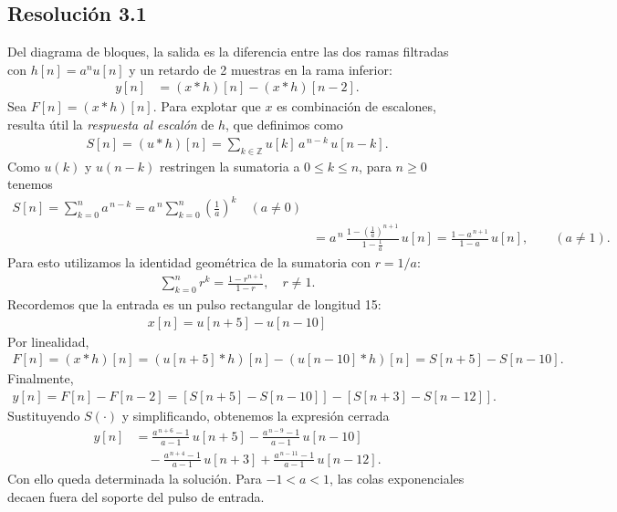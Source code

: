 \documentclass[
  11pt,
  letterpaper,
   addpoints,
   answers
  ]{exam}
\begin{document}
\begin{questions}
\begin{solution}
  \subsection*{Resolución 3.1}
Del diagrama de bloques, la salida es la diferencia entre las dos ramas filtradas con $h[n]=a^n u[n]$ y un retardo de 2 muestras en la rama inferior:
\begin{align}
  y[n] &= (x*h)[n] - (x*h)[n-2].
\end{align}
Sea $F[n]=(x*h)[n]$. Para explotar que $x$ es combinación de escalones, resulta útil la \emph{respuesta al escalón} de $h$, que definimos como
\begin{align}
  S[n] = (u*h)[n] = \sum_{k\in\mathbb{Z}} u[k] \, a^{\,n-k} \, u[n-k].
\end{align}
Como $u(k)$ y $u(n-k)$ restringen la sumatoria a $0\le k\le n$, para $n\ge 0$ tenemos
\begin{align}
  S[n] = \sum_{k=0}^{n} a^{\,n-k}
       = a^{\,n} \sum_{k=0}^{n} \left(\frac{1}{a}\right)^{\!k} \quad (a\ne 0) \\
       &= a^{\,n} \, \frac{1-\left(\frac{1}{a}\right)^{\!n+1}}{1-\frac{1}{a}}\,u[n]
       = \frac{1-a^{\,n+1}}{1-a}\,u[n],\qquad (a\ne 1).
\end{align}
Para esto utilizamos la identidad geométrica de la sumatoria con $r=1/a$:
\begin{align}
  \sum_{k=0}^n r^k = \frac{1-r^{n+1}}{1-r}, \quad r \neq 1.
\end{align}
Recordemos que la entrada es un pulso rectangular de longitud 15:
\begin{align}
  x[n] = u[n+5] - u[n-10]
\end{align}
Por linealidad,
\begin{align}
  F[n] = (x*h)[n] = (u[n+5]*h)[n] - (u[n-10]*h)[n] = S[n+5] - S[n-10].
\end{align}
Finalmente,
\begin{align}
  y[n] = F[n] - F[n-2] = [S[n+5] - S[n-10]] - [S[n+3] - S[n-12]].
\end{align}
Sustituyendo $S(\cdot)$ y simplificando, obtenemos la expresión cerrada
\begin{align}
  y[n]
  &= \frac{a^{\,n+6}-1}{a-1} \, u[n+5]
   - \frac{a^{\,n-9}-1}{a-1} \, u[n-10] \\
  &\quad - \frac{a^{\,n+4}-1}{a-1} \, u[n+3]
   + \frac{a^{\,n-11}-1}{a-1} \, u[n-12].
\end{align}
Con ello queda determinada la solución. Para $-1<a<1$, las colas exponenciales decaen fuera del soporte del pulso de entrada.
\end{solution}


\end{questions}
\end{document}

